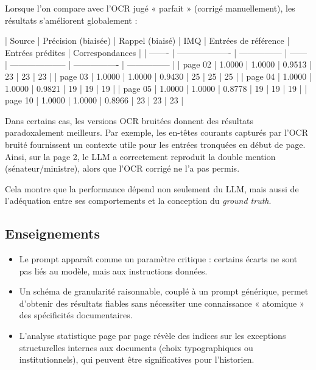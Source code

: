 Lorsque l’on compare avec l’OCR jugé « parfait » (corrigé manuellement), les résultats s’améliorent globalement :

| Source  | Précision (biaisée) | Rappel (biaisé) | IMQ    | Entrées de référence | Entrées prédites | Correspondances |
| ------- | ------------------- | --------------- | ------ | -------------------- | ---------------- | --------------- |
| page 02 | 1.0000              | 1.0000          | 0.9513 | 23                   | 23               | 23              |
| page 03 | 1.0000              | 1.0000          | 0.9430 | 25                   | 25               | 25              |
| page 04 | 1.0000              | 1.0000          | 0.9821 | 19                   | 19               | 19              |
| page 05 | 1.0000              | 1.0000          | 0.8778 | 19                   | 19               | 19              |
| page 10 | 1.0000              | 1.0000          | 0.8966 | 23                   | 23               | 23              |

Dans certains cas, les versions OCR bruitées donnent des résultats paradoxalement meilleurs. Par exemple, les en-têtes courants capturés par l’OCR bruité fournissent un contexte utile pour les entrées tronquées en début de page. Ainsi, sur la page 2, le LLM a correctement reproduit la double mention (sénateur/ministre), alors que l’OCR corrigé ne l’a pas permis.

Cela montre que la performance dépend non seulement du LLM, mais aussi de l’adéquation entre ses comportements et la conception du \emph{ground truth}.

\subsection{Enseignements}

\begin{itemize}
\item Le prompt apparaît comme un paramètre critique : certains écarts ne sont pas liés au modèle, mais aux instructions données.
\item Un schéma de granularité raisonnable, couplé à un prompt générique, permet d’obtenir des résultats fiables sans nécessiter une connaissance « atomique » des spécificités documentaires.
\item L’analyse statistique page par page révèle des indices sur les exceptions structurelles internes aux documents (choix typographiques ou institutionnels), qui peuvent être significatives pour l’historien.

\end{itemize}
